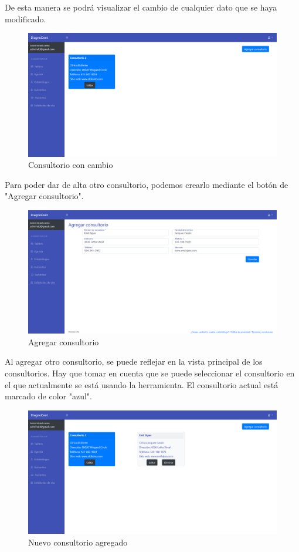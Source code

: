 De esta manera se podrá visualizar el cambio de cualquier dato que se haya modificado.

\begin{figure}[H]
\centering
\includegraphics[width=17cm,keepaspectratio]{pictures/adminodo/login/consultorio-2.png}
\caption{Consultorio con cambio}
\end{figure}

Para poder dar de alta otro consultorio, podemos crearlo mediante el botón de "Agregar consultorio".

\begin{figure}[H]
\centering
\includegraphics[width=17cm,keepaspectratio]{pictures/adminodo/login/agregar-consultorio.png}
\caption{Agregar consultorio}
\end{figure}

Al agregar otro consultorio, se puede reflejar en la vista principal de los consultorios. Hay que tomar en cuenta que se puede seleccionar el consultorio en el que actualmente se está usando la herramienta. El consultorio actual está marcado de color "azul".

\begin{figure}[H]
\centering
\includegraphics[width=17cm,keepaspectratio]{pictures/adminodo/login/consultorio-3.png}
\caption{Nuevo consultorio agregado}
\end{figure}

